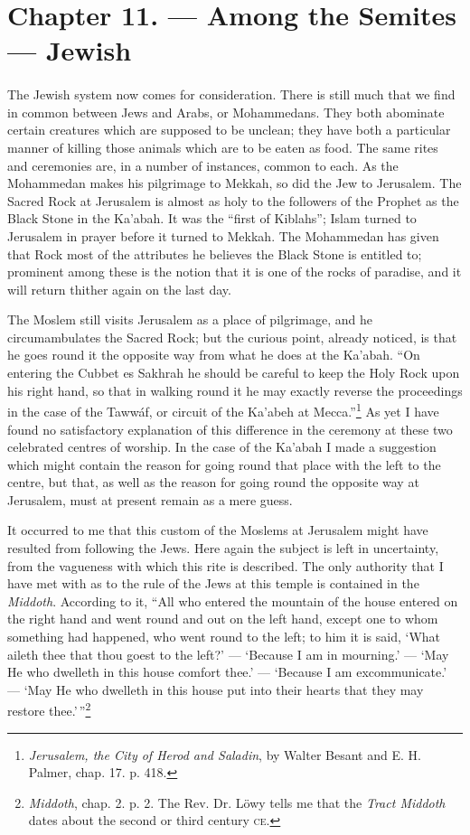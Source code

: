 \documentclass[a4paper, 11pt, oneside, polutonikogreek, english]{article}
\begin{document}
\section{Chapter 11. --- Among the Semites --- Jewish}
\paragraph{}
The Jewish system now comes for consideration. There is still much that we find in common between Jews and Arabs, or Mohammedans. They both abominate certain creatures which are supposed to be unclean; they have both a particular manner of killing those animals which are to be eaten as food. The same rites and ceremonies are, in a number of instances, common to each. As the Mohammedan makes his pilgrimage to Mekkah, so did the Jew to Jerusalem. The Sacred Rock at Jerusalem is almost as holy to the followers of the Prophet as the Black Stone in the Ka'abah. It was the ``first of Kiblahs''; Islam turned to Jerusalem in prayer before it turned to Mekkah. The Mohammedan has given that Rock most of the attributes he believes the Black Stone is entitled to; prominent among these is the notion that it is one of the rocks of paradise, and it will return thither again on the last day.

The Moslem still visits Jerusalem as a place of pilgrimage, and he circumambulates the Sacred Rock; but the curious point, already noticed, is that he goes round it the opposite way from what he does at the Ka'abah. ``On entering the Cubbet es Sakhrah he should be careful to keep the Holy Rock upon his right hand, so that in walking round it he may exactly reverse the proceedings in the case of the Tawwáf, or circuit of the Ka'abeh at Mecca.''\footnote{\emph{Jerusalem, the City of Herod and Saladin}, by Walter Besant and E. H. Palmer, chap. 17. p. 418.} As yet I have found no satisfactory explanation of this difference in the ceremony at these two celebrated centres of worship. In the case of the Ka'abah I made a suggestion which might contain the reason for going round that place with the left to the centre, but that, as well as the reason for going round the opposite way at Jerusalem, must at present remain as a mere guess.

It occurred to me that this custom of the Moslems at Jerusalem might have resulted from following the Jews. Here again the subject is left in uncertainty, from the vagueness with which this rite is described. The only authority that I have met with as to the rule of the Jews at this temple is contained in the \emph{Middoth}. According to it, ``All who entered the mountain of the house entered on the right hand and went round and out on the left hand, except one to whom something had happened, who went round to the left; to him it is said, `What aileth thee that thou goest to the left?' --- `Because I am in mourning.' --- `May He who dwelleth in this house comfort thee.' --- `Because I am excommunicate.' --- `May He who dwelleth in this house put into their hearts that they may restore thee.'\,''\footnote{\emph{Middoth}, chap. 2. p. 2. The Rev. Dr. Löwy tells me that the \emph{Tract Middoth} dates about the second or third century \textsc{ce}.}
\end{document}
